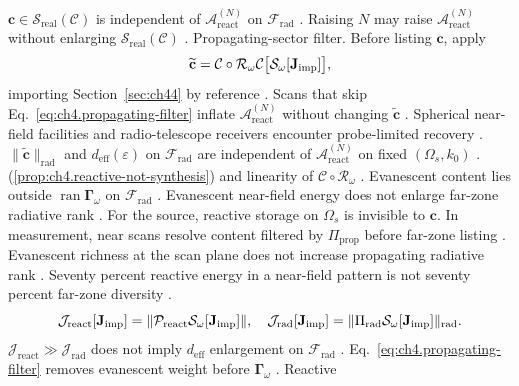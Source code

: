 \(\mathbf{c}\in\mathcal{S}_{\mathrm{real}}(\mathcal{C})\) is independent of \(\mathcal{A}_{\mathrm{react}}^{(N)}\) on \(\mathcal{F}_{\mathrm{rad}}\)
\cite{stratton1941}. Raising \(N\) may raise \(\mathcal{A}_{\mathrm{react}}^{(N)}\) without enlarging
\(\mathcal{S}_{\mathrm{real}}(\mathcal{C})\) \cite{devaney2004}.
Propagating-sector filter. Before listing \(\mathbf{c}\), apply
\begin{equation}
\label{eq:ch4.propagating-filter}
\widetilde{\mathbf{c}}=\mathcal{C}\circ\mathcal{R}_\omega\mathcal{C}\big[\mathcal{S}_\omega[\mathbf{J}_{\mathrm{imp}}]\big],
\end{equation}
importing Section~\ref{sec:ch44} by reference \cite{stratton1941}. Scans that skip Eq.~\eqref{eq:ch4.propagating-filter} inflate
\(\mathcal{A}_{\mathrm{react}}^{(N)}\) without changing \(\widetilde{\mathbf{c}}\) \cite{devaney2004}.
\label{thm:ch4.ev-invisible-export}
Spherical near-field facilities and radio-telescope receivers encounter probe-limited recovery \cite{hansen1988}.
\(\|\widetilde{\mathbf{c}}\|_{\mathrm{rad}}\) and \(d_{\mathrm{eff}}(\varepsilon)\) on \(\mathcal{F}_{\mathrm{rad}}\) are independent of
\(\mathcal{A}_{\mathrm{react}}^{(N)}\) on fixed \((\Omega_{s},k_{0})\) \cite{stratton1941}.
(\ref{prop:ch4.reactive-not-synthesis}) and linearity of \(\mathcal{C}\circ\mathcal{R}_\omega\) \cite{stratton1941}. Evanescent
content lies outside \(\operatorname{ran}\boldsymbol{\Gamma}_\omega\) on \(\mathcal{F}_{\mathrm{rad}}\) \cite{devaney2004}.
Evanescent near-field energy does not enlarge far-zone radiative rank \cite{stratton1941}. For the source, reactive storage on $\Omega_{s}$ is invisible to $\mathbf{c}$. In measurement, near scans resolve content filtered by $\Pi_{\mathrm{prop}}$ before far-zone listing \cite{harrington2001}.
Evanescent richness at the scan plane does not increase propagating radiative rank \cite{harrington2001}. Seventy percent reactive energy in a near-field pattern is not seventy percent far-zone diversity \cite{hansen1988}.
\begin{equation}
\label{eq:ch4.reactive-radiative-split}
\mathcal{J}_{\mathrm{react}}[\mathbf{J}_{\mathrm{imp}}]=\|\mathcal{P}_{\mathrm{react}}\mathcal{S}_\omega[\mathbf{J}_{\mathrm{imp}}]\|,\quad
\mathcal{J}_{\mathrm{rad}}[\mathbf{J}_{\mathrm{imp}}]=\|\Pi_{\mathrm{rad}}\mathcal{S}_\omega[\mathbf{J}_{\mathrm{imp}}]\|_{\mathrm{rad}}.
\end{equation}
\label{thm:ch4.reactive-dominance}
\(\mathcal{J}_{\mathrm{react}}\gg\mathcal{J}_{\mathrm{rad}}\) does not imply \(d_{\mathrm{eff}}\) enlargement on \(\mathcal{F}_{\mathrm{rad}}\)
\cite{stratton1941}.
Eq.~\eqref{eq:ch4.propagating-filter} removes evanescent weight before \(\boldsymbol{\Gamma}_\omega\) \cite{stratton1941}. Reactive
